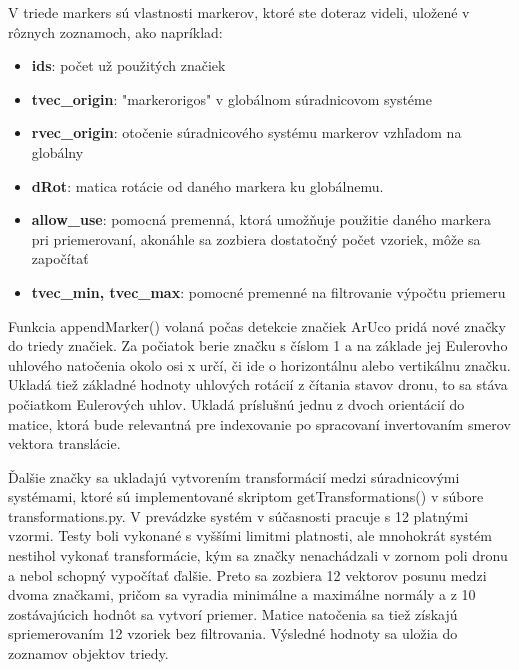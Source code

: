 V triede markers sú vlastnosti markerov, ktoré ste doteraz videli, uložené v rôznych zoznamoch, ako napríklad:
\begin{itemize}
    \item \textbf{ids}: počet už použitých značiek
    \item \textbf{tvec\_origin}: "markerorigos" v globálnom súradnicovom systéme
    \item \textbf{rvec\_origin}: otočenie súradnicového systému markerov vzhľadom na globálny
    \item \textbf{dRot}: matica rotácie od daného markera ku globálnemu.
    \item \textbf{allow\_use}: pomocná premenná, ktorá umožňuje použitie daného markera pri priemerovaní, akonáhle sa zozbiera dostatočný počet vzoriek, môže sa započítať
    \item \textbf{tvec\_min, tvec\_max}: pomocné premenné na filtrovanie výpočtu priemeru
\end{itemize}

Funkcia appendMarker() volaná počas detekcie značiek ArUco pridá nové značky do triedy značiek. Za počiatok berie značku s číslom 1 a na základe jej Eulerovho uhlového natočenia okolo osi x určí, či ide o horizontálnu alebo vertikálnu značku. Ukladá tiež základné hodnoty uhlových rotácií z čítania stavov dronu, to sa stáva počiatkom Eulerových uhlov. Ukladá príslušnú jednu z dvoch orientácií do matice, ktorá bude relevantná pre indexovanie po spracovaní invertovaním smerov vektora translácie.

Ďalšie značky sa ukladajú vytvorením transformácií medzi súradnicovými systémami, ktoré sú implementované skriptom getTransformations() v súbore transformations.py. V prevádzke systém v súčasnosti pracuje s 12 platnými vzormi. Testy boli vykonané s vyššími limitmi platnosti, ale mnohokrát systém nestihol vykonať transformácie, kým sa značky nenachádzali v zornom poli dronu a nebol schopný vypočítať ďalšie. Preto sa zozbiera 12 vektorov posunu medzi dvoma značkami, pričom sa vyradia minimálne a maximálne normály a z 10 zostávajúcich hodnôt sa vytvorí priemer. Matice natočenia sa tiež získajú spriemerovaním 12 vzoriek bez filtrovania. Výsledné hodnoty sa uložia do zoznamov objektov triedy.

